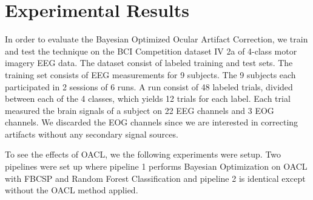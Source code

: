 \section{Experimental Results}
In order to evaluate the Bayesian Optimized Ocular Artifact Correction, we train and test the technique on the BCI Competition dataset IV 2a of 4-class motor imagery EEG data. The dataset consist of labeled training and test sets. The training set consists of EEG measurements for 9 subjects. The 9 subjects each participated in 2 sessions of 6 runs. A run consist of 48 labeled trials, divided between each of the 4 classes, which yields 12 trials for each label. Each trial measured the brain signals of a subject on 22 EEG channels and 3 EOG channels. We discarded the EOG channels since we are interested in correcting artifacts without any secondary signal sources.

To see the effects of OACL, we the following experiments were setup. Two pipelines were set up where pipeline 1 performs Bayesian Optimization on OACL with FBCSP and Random Forest Classification and pipeline 2 is identical except without the OACL method applied.

